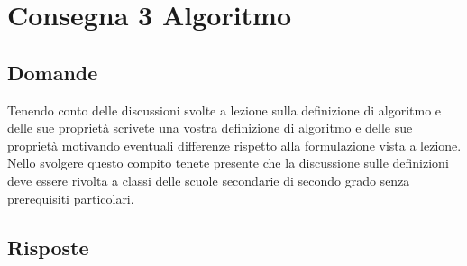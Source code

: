 \documentclass[a4paper]{article}
\begin{document}
\section{Consegna 3 \large Algoritmo}
\subsection{Domande}
Tenendo conto delle discussioni svolte a lezione sulla definizione di algoritmo e  delle sue proprietà scrivete una vostra definizione di algoritmo e delle sue proprietà motivando eventuali differenze rispetto alla formulazione vista a lezione. Nello svolgere  questo compito tenete presente che la discussione sulle definizioni deve essere rivolta a classi delle scuole secondarie di secondo grado senza prerequisiti particolari.
\subsection{Risposte}
\end{document}
